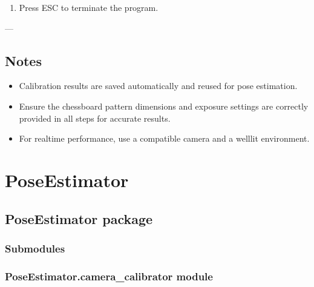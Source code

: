 \documentclass[letterpaper,10pt,english]{sphinxmanual}
\begin{document}
\begin{enumerate}
%
\setcounter{enumi}{4}
\item {} 
\sphinxAtStartPar
Press ESC to terminate the program.

\end{enumerate}

\sphinxAtStartPar
—


\section{Notes}
\label{\detokenize{introduction:notes}}\begin{itemize}
\item {} 
\sphinxAtStartPar
Calibration results are saved automatically and reused for pose estimation.

\item {} 
\sphinxAtStartPar
Ensure the chessboard pattern dimensions and exposure settings are correctly provided in all steps for accurate results.

\item {} 
\sphinxAtStartPar
For real\sphinxhyphen{}time performance, use a compatible camera and a well\sphinxhyphen{}lit environment.

\end{itemize}

\sphinxstepscope


\chapter{PoseEstimator}
\label{\detokenize{modules:poseestimator}}\label{\detokenize{modules::doc}}
\sphinxstepscope


\section{PoseEstimator package}
\label{\detokenize{PoseEstimator:poseestimator-package}}\label{\detokenize{PoseEstimator::doc}}

\subsection{Submodules}
\label{\detokenize{PoseEstimator:submodules}}

\subsection{PoseEstimator.camera\_calibrator module}
\label{\detokenize{PoseEstimator:module-PoseEstimator.camera_calibrator}}\label{\detokenize{PoseEstimator:poseestimator-camera-calibrator-module}}
\end{document}

